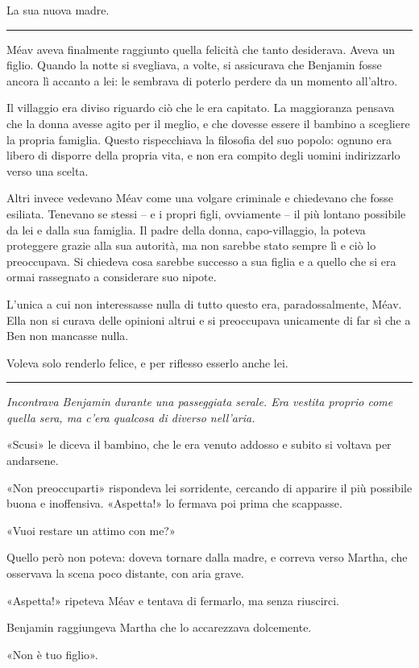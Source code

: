 \documentclass[a4paper,10pt]{memoir}
\begin{document}
La sua nuova madre.

\plainbreak{1}

Méav aveva finalmente raggiunto quella felicità che tanto desiderava. Aveva un figlio. Quando la notte si svegliava, a
volte, si assicurava che Benjamin fosse ancora lì accanto a lei: le sembrava di poterlo perdere da un momento all'altro.

Il villaggio era diviso riguardo ciò che le era capitato. La maggioranza pensava che la donna avesse agito per il
meglio, e che dovesse essere il bambino a scegliere la propria famiglia. Questo rispecchiava la filosofia del suo
popolo: ognuno era libero di disporre della propria vita, e non era compito degli uomini indirizzarlo verso una scelta.

Altri invece vedevano Méav come una volgare criminale e chiedevano che fosse esiliata. Tenevano se stessi -- e i propri
figli, ovviamente -- il più lontano possibile da lei e dalla sua famiglia. Il padre della donna, capo-villaggio, la
poteva proteggere grazie alla sua autorità, ma non sarebbe stato sempre lì e ciò lo preoccupava. Si chiedeva cosa
sarebbe successo a sua figlia e a quello che si era ormai rassegnato a considerare suo nipote.

L'unica a cui non interessasse nulla di tutto questo era, paradossalmente, Méav. Ella non si curava delle opinioni
altrui e si preoccupava unicamente di far sì che a Ben non mancasse nulla.

Voleva solo renderlo felice, e per riflesso esserlo anche lei.

\plainbreak{1}

{\itshape
Incontrava Benjamin durante una passeggiata serale. Era vestita proprio come quella sera, ma c'era qualcosa di diverso
nell'aria.

«Scusi» le diceva il bambino, che le era venuto addosso e subito si voltava per andarsene.

«Non preoccuparti» rispondeva lei sorridente, cercando di apparire il più possibile buona e inoffensiva. «Aspetta!» lo
fermava poi prima che scappasse.

«Vuoi restare un attimo con me?»

Quello però non poteva: doveva tornare dalla madre, e correva verso Martha, che osservava la scena poco distante, con
aria grave.

«Aspetta!» ripeteva Méav e tentava di fermarlo, ma senza riuscirci.

Benjamin raggiungeva Martha che lo accarezzava dolcemente.

«Non è tuo figlio».
\/}
\end{document}
